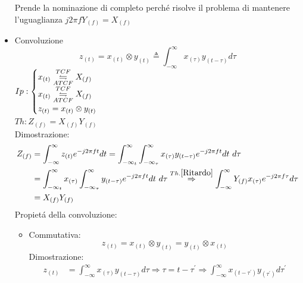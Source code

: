 \begin{itemize}
{                    Prende la nominazione di completo perché risolve il problema di mantenere l'uguaglianza $j2\pi fY_{(f)} = X_{(f)}$
                    
                }
                \item{Convoluzione\\
                    \[
                        z_{(t)} = x_{(t)} \otimes  y_{(t)} \triangleq \int_{-\infty}^{\infty} x_{(\tau)}y_{(t-\tau)} d\tau
                    \] 
                    $Ip:\begin{cases}
                        x_{(t)}\overunderset{TCF}{ATCF}{\leftrightharpoons} X_{(f)} \\
                        x_{(t)}\overunderset{TCF}{ATCF}{\leftrightharpoons} X_{(f)} \\
                        z_{(t)} = x_{(t)} \otimes  y_{(t)}   
                    \end{cases}$\\
                    $Th: Z_{(f)} = X_{(f)}Y_{(f)} $ \\
                    Dimostrazione:
                        \begin{align}
                            Z_{(f)} &= \int_{-\infty}^{\infty} z_{(t)} e^{-j2\pi ft} dt = \int_{-\infty_{t}}^{\infty}\int_{-\infty_{\tau}}^{\infty} x_{(\tau)}y_{(t-\tau)} e^{-j2\pi ft} dt\ d\tau \nonumber \\
                                    &= \int_{-\infty_{t}}^{\infty}x_{(\tau)}\int_{-\infty_{\tau}}^{\infty} y_{(t-\tau)}e^{-j2\pi ft}  dt\ d\tau \overset{Th. \ref{Ritardo}}{\Rightarrow} \int_{-\infty}^{\infty}Y_{(f)}x_{(\tau)}e^{-j2\pi f\tau} d\tau  \nonumber \\
                                    &= X_{(f)}Y_{(f)} \nonumber
                        \end{align}
                    Propietá della convoluzione:
                    \begin{itemize}
                        \item {
                                Commutativa:
                                \[
                                    z_{(t)} = x_{(t)} \otimes  y_{(t)} = y_{(t)} \otimes  x_{(t)}  
                                \]
                                Dimostrazione:
                                \begin{align}
                                    z_{(t)} &= \int_{-\infty}^{\infty} x_{(\tau)}y_{(t-\tau)} d\tau \Rightarrow \tau=t-\tau^\prime\Rightarrow \int_{-\infty}^{\infty} x_{(t-\tau^\prime)}y_{(\tau^\prime)} d\tau^\prime \nonumber \\

\end{align}}
\end{itemize}}
\end{itemize}
